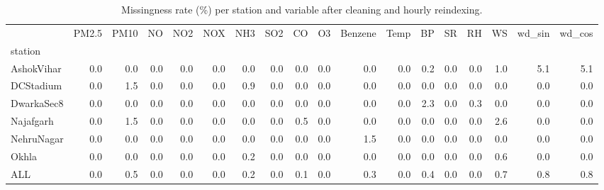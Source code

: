 \begin{table}
\caption{Missingness rate (\%) per station and variable after cleaning and hourly reindexing.}
\label{tab:missingness_station_variable}
\begin{tabular}{lrrrrrrrrrrrrrrrrr}
\toprule
 & PM2.5 & PM10 & NO & NO2 & NOX & NH3 & SO2 & CO & O3 & Benzene & Temp & BP & SR & RH & WS & wd\_sin & wd\_cos \\
station &  &  &  &  &  &  &  &  &  &  &  &  &  &  &  &  &  \\
\midrule
AshokVihar & 0.0 & 0.0 & 0.0 & 0.0 & 0.0 & 0.0 & 0.0 & 0.0 & 0.0 & 0.0 & 0.0 & 0.2 & 0.0 & 0.0 & 1.0 & 5.1 & 5.1 \\
DCStadium & 0.0 & 1.5 & 0.0 & 0.0 & 0.0 & 0.9 & 0.0 & 0.0 & 0.0 & 0.0 & 0.0 & 0.0 & 0.0 & 0.0 & 0.0 & 0.0 & 0.0 \\
DwarkaSec8 & 0.0 & 0.0 & 0.0 & 0.0 & 0.0 & 0.0 & 0.0 & 0.0 & 0.0 & 0.0 & 0.0 & 2.3 & 0.0 & 0.3 & 0.0 & 0.0 & 0.0 \\
Najafgarh & 0.0 & 1.5 & 0.0 & 0.0 & 0.0 & 0.0 & 0.0 & 0.5 & 0.0 & 0.0 & 0.0 & 0.0 & 0.0 & 0.0 & 2.6 & 0.0 & 0.0 \\
NehruNagar & 0.0 & 0.0 & 0.0 & 0.0 & 0.0 & 0.0 & 0.0 & 0.0 & 0.0 & 1.5 & 0.0 & 0.0 & 0.0 & 0.0 & 0.0 & 0.0 & 0.0 \\
Okhla & 0.0 & 0.0 & 0.0 & 0.0 & 0.0 & 0.2 & 0.0 & 0.0 & 0.0 & 0.0 & 0.0 & 0.0 & 0.0 & 0.0 & 0.6 & 0.0 & 0.0 \\
ALL & 0.0 & 0.5 & 0.0 & 0.0 & 0.0 & 0.2 & 0.0 & 0.1 & 0.0 & 0.3 & 0.0 & 0.4 & 0.0 & 0.0 & 0.7 & 0.8 & 0.8 \\
\bottomrule
\end{tabular}
\end{table}
